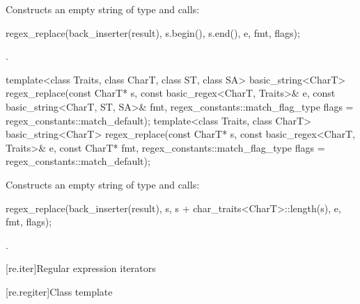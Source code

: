 \begin{itemdescr}
\pnum
\effects
Constructs an empty string  of
type  and calls:
\begin{codeblock}
regex_replace(back_inserter(result), s.begin(), s.end(), e, fmt, flags);
\end{codeblock}

\pnum
\returns
{}.
\end{itemdescr}

%
\begin{itemdecl}
template<class Traits, class CharT, class ST, class SA>
  basic_string<CharT>
    regex_replace(const CharT* s,
                  const basic_regex<CharT, Traits>& e,
                  const basic_string<CharT, ST, SA>& fmt,
                  regex_constants::match_flag_type flags = regex_constants::match_default);
template<class Traits, class CharT>
  basic_string<CharT>
    regex_replace(const CharT* s,
                  const basic_regex<CharT, Traits>& e,
                  const CharT* fmt,
                  regex_constants::match_flag_type flags = regex_constants::match_default);
\end{itemdecl}

\begin{itemdescr}
\pnum
\effects
Constructs an empty string  of
type  and calls:
\begin{codeblock}
regex_replace(back_inserter(result), s, s + char_traits<CharT>::length(s), e, fmt, flags);
\end{codeblock}

\pnum
\returns
{}.
\end{itemdescr}

[re.iter]{Regular expression iterators}

[re.regiter]{Class template }

